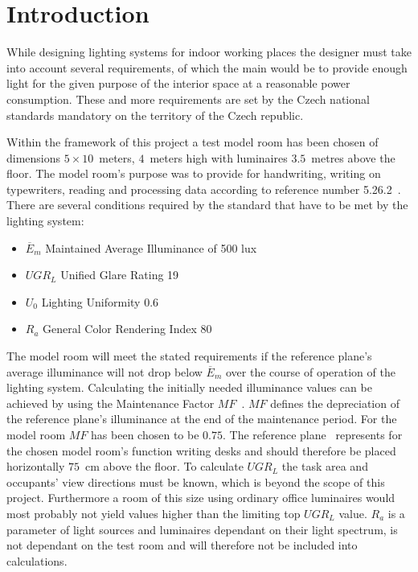 \section{Introduction} \label{sec:intro}
While designing lighting systems for indoor working places the designer must take into account several requirements, of which the main would be to provide enough light for the given purpose of the interior space at a reasonable power consumption. These and more requirements are set by the Czech national standards \cite{12464} mandatory on the territory of the Czech republic.

Within the framework of this project a test model room has been chosen of dimensions $5 \times 10 $~meters, $4$~meters high with luminaires $3.5$~metres above the floor. The model room's purpose was to provide for handwriting, writing on typewriters, reading and processing data according to reference number 5.26.2~\cite{12464}. There are several conditions required by the standard that have to be met by the lighting system:


\begin{itemize}
	\item $\overline{E}_{m}$ Maintained Average Illuminance of 500 lux
	\item $UGR_{L}$ Unified Glare Rating 19
	\item $U_{0}$ Lighting Uniformity 0.6
	\item $R_{a}$ General Color Rendering Index 80
\end{itemize}

The model room will meet the stated requirements if the reference plane's average illuminance will not drop below $\overline{E}_{m}$ over the course of operation of the lighting system. Calculating the initially needed illuminance values can be achieved by using the Maintenance Factor $MF$~\cite{CIE97}. $MF$ defines the depreciation of the reference plane's illuminance at the end of the maintenance period. For the model room $MF$ has been chosen to be $0.75$. The reference plane~\cite{12464} represents for the chosen model room's function writing desks and should therefore be placed horizontally $75$~cm above the floor. To calculate $UGR_{L}$ the task area and occupants' view directions must be known, which is beyond the scope of this project. Furthermore a room of this size using ordinary office luminaires would most probably not yield values higher than the limiting top $UGR_{L}$ value. $R_{a}$ is a parameter of light sources and luminaires dependant on their light spectrum, is not dependant on the test room and will therefore not be included into calculations.